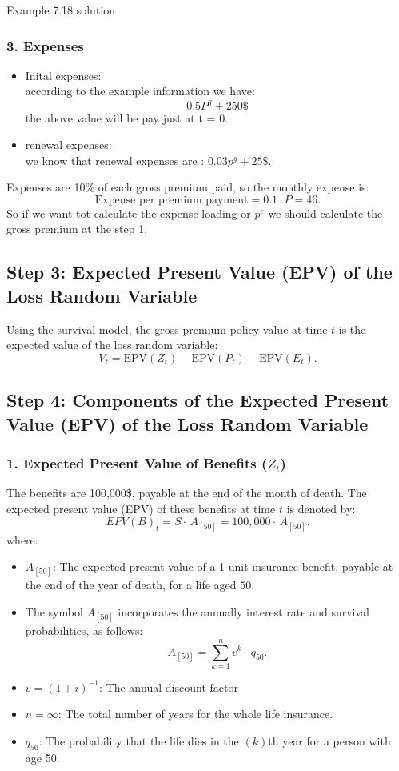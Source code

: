 \begin{solve}{}{Example 7.18 solution}
		\subsubsection*{3. Expenses}
			\begin{itemize}
			\item Inital expenses:\\
			according to the example information we have:
			$$0.5P^g + 250\$$$ 
			the above value will be pay just at t = 0.
		
			\item renewal expenses:\\
			we know that renewal expenses are :
			$0.03 p^g + 25\$$.
			\end{itemize}

		Expenses are 10\% of each gross premium paid, so the monthly expense is:
		\[
		\text{Expense per premium payment} = 0.1 \cdot P = 46.
		\]
		So if we want tot calculate the expense loading or $p^e$ we should calculate the gross premium at the step 1.
		
		
		\subsection*{Step 3: Expected Present Value (EPV) of the Loss Random Variable}
		Using the survival model, the gross premium policy value at time $t$ is the expected value of the loss random variable:
		\[
		V_t = \text{EPV}(Z_t) - \text{EPV}(P_t) - \text{EPV}(E_t).
		\]
		\subsection*{Step 4: Components of the Expected Present Value (EPV) of the Loss Random Variable}
		\subsubsection*{1. Expected Present Value of Benefits (\(Z_t\))}
		
		The benefits are 100,000\$, payable at the end of the month of death. The expected present value (EPV) of these benefits at time \(t\) is denoted by:
		\[
		EPV(B)_t = S \cdot \,  A_{[50]} = 100,000 \cdot \,  A_{[50]}.
		\]
		where:
		\begin{itemize}
			\item \(A_{[50]}\): The expected present value of a 1-unit insurance benefit, payable at the end of the year of death, for a life aged \(50\).
			\item The symbol \( A_{[50]}\) incorporates the annually interest rate and survival probabilities, as follows:
			\[
			A_{[50]} = \sum_{k=1}^{n} v^{k} \cdot \,q_{50}.
			\]
			\item \(v = (1+i)^{-1}\): The annual discount factor %
			\item \(n = \infty\): The total number of years for the whole life insurance.
			\item \(q_{50}\): The probability that the life dies in the \((k)\)th year for a person with age 50.
		\end{itemize}
		

\end{solve}
